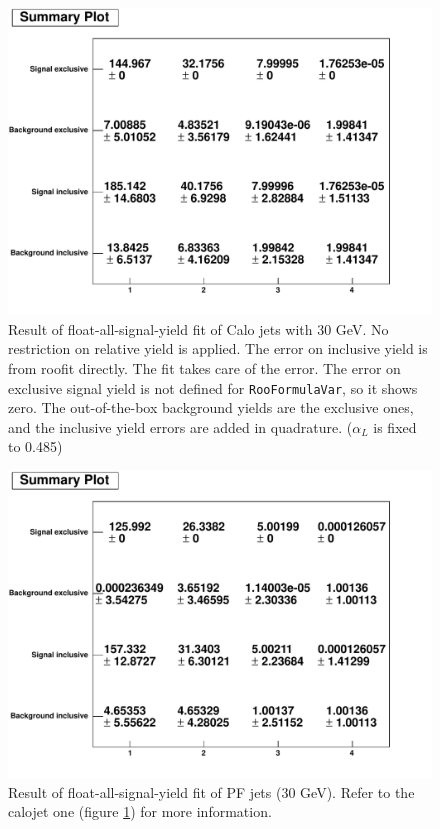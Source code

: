 \begin{figure}
\includegraphics[width=120mm]{DailyLog/6272/6272_FitSummaryPlot_FloatAll_Calo}
\caption{Result of float-all-signal-yield fit of Calo jets with 30 GeV.  No restriction on relative yield is applied.  The error on inclusive yield is from roofit directly.  The fit takes care of the error.
The error on exclusive signal yield is not defined for \texttt{RooFormulaVar}, so it shows zero.  The out-of-the-box background yields are the exclusive ones, and the inclusive yield errors
are added in quadrature.  ($\alpha_L$ is fixed to 0.485)}
\label{Figure_6272FitSummaryPlotFloatAllCalo}
\end{figure}

\begin{figure}
\includegraphics[width=120mm]{DailyLog/6272/6272_FitSummaryPlot_FloatAll_PF}
\caption{Result of float-all-signal-yield fit of PF jets (30 GeV).  Refer to the calojet one (figure \ref{Figure_6272FitSummaryPlotFloatAllCalo})
for more information.}
\label{Figure_6272FitSummaryPlotFloatAllPF}
\end{figure}

